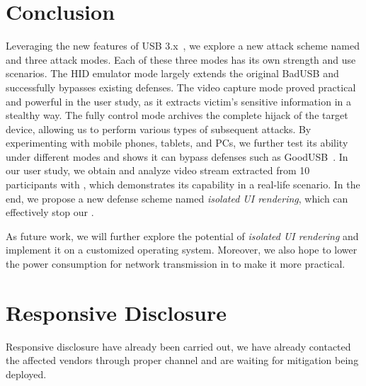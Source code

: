 \section{Conclusion}
\label{sec:conclusion}

Leveraging the new features of USB 3.x~\cite{usb30,usb31,usb32}, we explore a
new attack scheme named \tool and three attack modes. Each of these three modes
has its own strength and use scenarios. The HID emulator mode largely extends the
original BadUSB and successfully bypasses existing defenses. The video capture mode proved practical and powerful in the user study, as it extracts
victim's sensitive information in a stealthy way. The fully control mode
archives the complete hijack of the target device, allowing us to perform various
types of subsequent attacks. By experimenting \tool with mobile phones, tablets,
and PCs, we further test its ability under different modes and shows it can
bypass defenses such as GoodUSB~\cite{tian2015defending}. In our user study, we
obtain and analyze video stream extracted from 10 participants with \tool,
which demonstrates its capability in a real-life scenario. In the end, we
propose a new defense scheme named \textit{isolated UI rendering}, which can
effectively stop our \tool.

As future work, we will further explore the potential of \textit{isolated UI
rendering} and implement it on a customized operating system. Moreover, we also
hope to lower the power consumption for network transmission in \tool to make
it more practical.

\section{Responsive Disclosure}

Responsive disclosure have already been carried out, we have already contacted the affected vendors through proper channel and are waiting for mitigation being deployed.